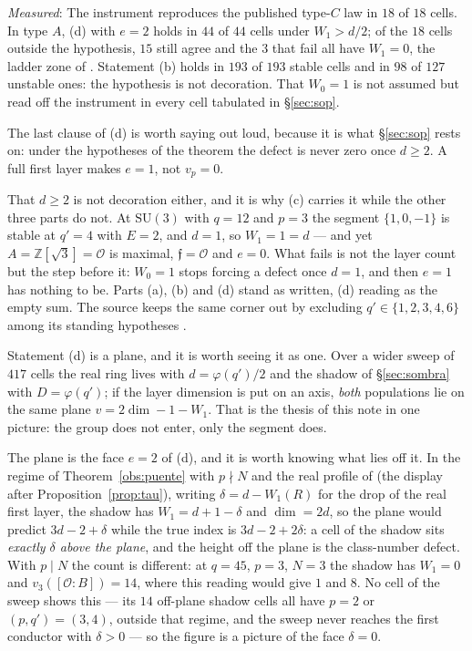 \documentclass[11pt,a4paper]{article}
\theoremstyle{definition}
\newcommand{\SU}{\mathrm{SU}}
\newcommand{\ZZ}{\mathbb{Z}}
\newcommand{\cO}{\mathcal{O}}
\newcommand{\medido}[1]{\emph{Measured}: #1}
\begin{document}
\medido{The instrument reproduces the published type-$C$ law in $18$ of $18$ cells. In type $A$,
(d) with $e=2$ holds in $44$ of $44$ cells under $W_1>d/2$; of the $18$ cells outside the
hypothesis, $15$ still agree and the $3$ that fail all have $W_1=0$, the ladder zone of
\cite{Cond}. Statement (b) holds in
$193$ of $193$ stable cells and in $98$ of $127$ unstable ones: the hypothesis is not decoration.
That $W_0=1$ is not assumed but read off the instrument in every cell tabulated in
\S\ref{sec:sop}.}

The last clause of (d) is worth saying out loud, because it is what \S\ref{sec:sop} rests on: under
the hypotheses of the theorem the defect is never zero once $d\ge2$. A full first layer makes $e=1$,
not $v_p=0$.

That $d\ge2$ is not decoration either, and it is why (c) carries it while the other three parts do
not. At $\SU(3)$ with $q=12$ and $p=3$ the segment $\{1,0,-1\}$ is stable at $q'=4$ with $E=2$, and
$d=1$, so $W_1=1=d$ --- and yet $A=\ZZ[\sqrt3]=\cO$ is maximal, $\mathfrak f=\cO$ and $e=0$. What
fails is not the layer count but the step before it: $W_0=1$ stops forcing a defect once $d=1$, and
then $e=1$ has nothing to be. Parts (a), (b) and (d) stand as written, (d) reading as the empty sum.
The source keeps the same corner out by excluding $q'\in\{1,2,3,4,6\}$ among its standing hypotheses
\cite[\S5]{Cond}.

Statement (d) is a plane, and it is worth seeing it as one. Over a wider sweep of $417$ cells the
real ring lives with $d=\varphi(q')/2$ and the shadow of \S\ref{sec:sombra} with $D=\varphi(q')$; if
the layer dimension is put on an axis, \emph{both} populations lie on the same plane
$v=2\dim-1-W_1$. That is the thesis of this note in one picture: the group does not enter, only the
segment does.

The plane is the face $e=2$ of (d), and it is worth knowing what lies off it. In the regime of
Theorem~\ref{obs:puente} with $p\nmid N$ and the real profile of \cite{Cond} (the display after
Proposition~\ref{prop:tau}), writing $\delta=d-W_1(R)$ for the drop of the real first layer, the
shadow has $W_1=d+1-\delta$ and $\dim=2d$, so the plane would
predict $3d-2+\delta$ while the true index is $3d-2+2\delta$: a cell of the shadow sits
\emph{exactly $\delta$ above the plane}, and the height off the plane is the class-number defect.
With $p\mid N$ the count is different: at $q=45$, $p=3$, $N=3$ the shadow has $W_1=0$ and
$v_3([\cO:B])=14$, where this reading would give $1$ and $8$.
No cell of the sweep shows this --- its $14$ off-plane shadow cells all have $p=2$ or
$(p,q')=(3,4)$, outside that regime, and the sweep never reaches the first conductor with
$\delta>0$ --- so the figure is a picture of the face $\delta=0$.
\end{document}
